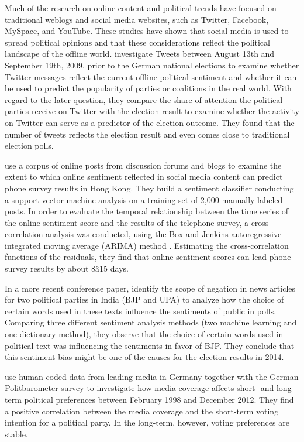 \documentclass[12pt,a4paper,notitlepage]{article}
\begin{document}
Much of the research on online content and political trends have focused on traditional weblogs and social media websites, such as Twitter, Facebook, MySpace, and YouTube. These studies have shown that social media is used to spread political opinions and that these considerations reflect the political landscape of the offline world. \citet{tumasjan_predicting_2010} investigate Tweets between August 13th and September 19th, 2009, prior to the German national elections to examine whether Twitter messages reflect the current offline political sentiment and whether it can be used to predict the popularity of parties or coalitions in the real world. With regard to the later question, they compare the share of attention the political parties receive on Twitter with the election result to examine whether the activity on Twitter can serve as a predictor of the election outcome. They found that the number of tweets reflects the election result and even comes close to traditional election polls.

\citet{fu_analyzing_2013} use a corpus of online posts from discussion forums and blogs to examine the extent to which online sentiment reflected in social media content can predict phone survey results in Hong Kong. They build a sentiment classifier conducting a support vector machine analysis on a training set of 2,000 manually labeled posts. In order to evaluate the temporal relationship between the time series of the online sentiment score and the results of the telephone survey, a cross correlation analysis was conducted, using the Box and Jenkins autoregressive integrated moving average (ARIMA) method \citep{box_time_2008}. Estimating the cross-correlation functions of the residuals, they find that online sentiment scores can lead phone survey results by about 8â15 days. 

In a more recent conference paper, \citet{padmaja_evaluating_2014} identify the scope of negation in news articles for two political parties in India (BJP and UPA) to analyze how the choice of certain words used in these texts influence the sentiments of public in polls. Comparing three different sentiment analysis methods (two machine learning and one dictionary method), they observe that the choice of certain words used in political text was influencing the sentiments in favor of BJP. They conclude that this sentiment bias might be one of the causes for the election results in 2014.

\citet{dewenter_can_2018} use human-coded data from leading media in Germany together with the German Politbarometer survey to investigate how media coverage affects short- and long-term political preferences between February 1998 and December 2012. They find a positive correlation between the media coverage and the short-term voting intention for a political party. In the long-term, however, voting preferences are stable. 
\end{document}
